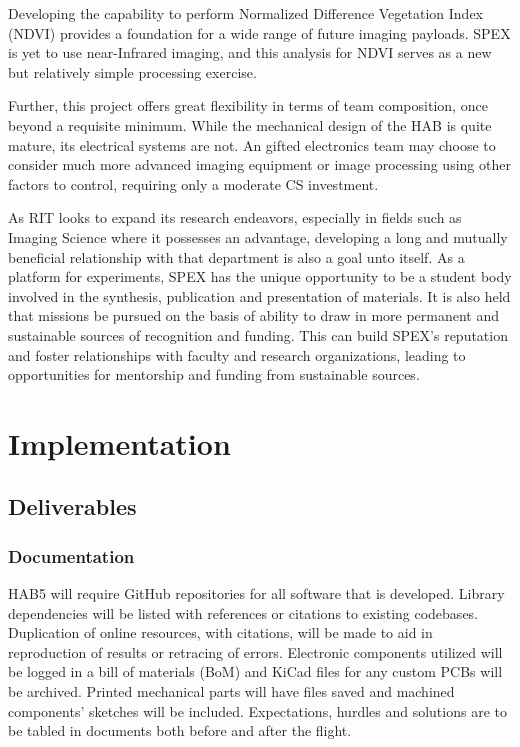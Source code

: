 \documentclass[conference]{IEEEtran} %
\begin{document}
Developing the capability to perform Normalized Difference Vegetation Index (NDVI) provides a foundation for a wide range of future imaging payloads. 
SPEX is yet to use near-Infrared imaging, and this analysis for NDVI serves as a new but relatively simple processing exercise.

Further, this project offers great flexibility in terms of team composition, once beyond a requisite minimum.
While the mechanical design of the HAB is quite mature, its electrical systems are not.
An gifted electronics team may choose to consider much more advanced imaging equipment or image processing using other factors to control, requiring only a moderate CS investment. 

As RIT looks to expand its research endeavors, especially in fields such as Imaging Science where it possesses an advantage, developing a long and mutually beneficial relationship with that department is also a goal unto itself. 
As a platform for experiments, SPEX has the unique opportunity to be a student body involved in the synthesis, publication and presentation of materials. 
It is also held that missions be pursued on the basis of ability to draw in more permanent and sustainable sources of recognition and funding. This can build SPEX's reputation and foster relationships with faculty and research organizations, leading to opportunities for mentorship and funding from sustainable sources.

\section{Implementation}
\label{implementation}
\subsection{Deliverables}
\label{deliverables}
\subsubsection{Documentation}
\label{deliverables-documentation}
 HAB5 will require GitHub repositories for all software that is developed. Library dependencies will be listed with references or citations to existing codebases. Duplication of online resources, with citations, will be made to aid in reproduction of results or retracing of errors.  
 Electronic components utilized will be logged in a bill of materials (BoM) and KiCad files for any custom PCBs will be archived. 
 Printed mechanical parts will have files saved and machined components' sketches will be included. 
 Expectations, hurdles and solutions are to be tabled in documents both before and after the flight.
\end{document}
